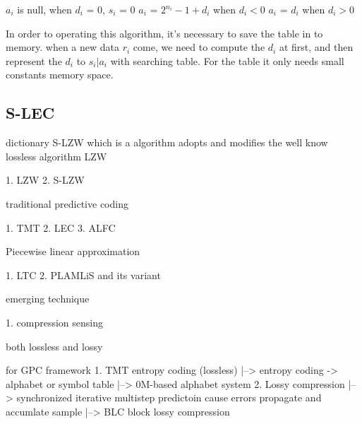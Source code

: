 \documentclass{report}
\begin{document}
$a_i$ is null, when $d_i$ = 0, $s_i$ = 0
$a_i$ = $2^{n_i} - 1 + d_i$ when $d_i < 0$
$a_i$ = $d_i$ when $d_i > 0 $




In order to operating this algorithm, it’s necessary to save the table in to memory. when a new data $r_i$ come, we need to compute the $d_i$ at first, and then represent the $d_i$ to $s_i|a_i$ with searching table. For the table it only needs small constants memory space.

\subsection{S-LEC}
dictionary 
S-LZW which is a algorithm adopts and modifies the well know lossless algorithm LZW


1. LZW
2. S-LZW


traditional predictive coding 

1. TMT
2. LEC
3. ALFC

Piecewise linear approximation

1. LTC
2. PLAMLiS and its variant

emerging technique 

1. compression sensing


both lossless and lossy


for GPC framework
1. TMT  entropy coding (lossless)
    |-->  entropy coding  ->  alphabet or symbol table
        |--> 0M-based alphabet system
2. Lossy compression
    |--> synchronized iterative multistep predictoin
    cause errors propagate and accumlate sample
        |--> BLC block lossy compression
\end{document}
